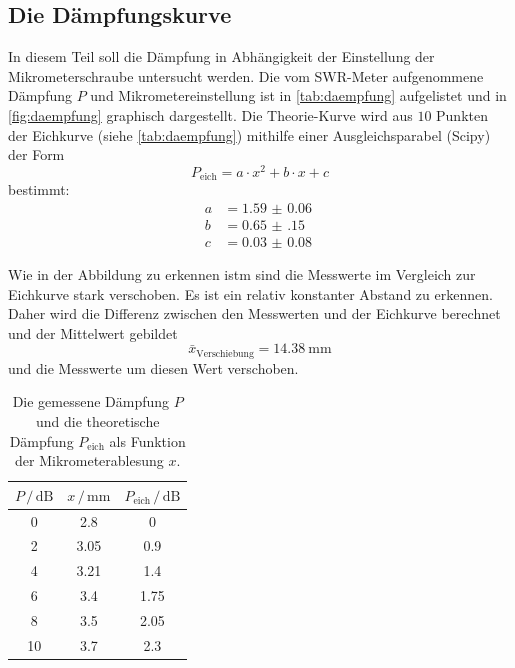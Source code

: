 \subsection{Die Dämpfungskurve}
In diesem Teil soll die Dämpfung in Abhängigkeit der Einstellung der Mikrometerschraube untersucht werden.
Die vom SWR-Meter aufgenommene Dämpfung $P$ und Mikrometereinstellung ist in \autoref{tab:daempfung} aufgelistet und in \autoref{fig:daempfung} graphisch dargestellt.
Die Theorie-Kurve wird aus $10$ Punkten der Eichkurve (siehe \autoref{tab:daempfung}) mithilfe einer Ausgleichsparabel (Scipy\cite{scipy}) der Form
\begin{equation*}
    P_\text{eich} = a \cdot x^2 + b \cdot x + c 
\end{equation*}
bestimmt:
\begin{align*}
    a &= \SI{1.59(6)}{} \\
    b &= \SI{0.65(15)}{} \\
    c &= \SI{0.03(8)}{}
\end{align*}

Wie in der Abbildung zu erkennen istm sind die Messwerte im Vergleich zur Eichkurve stark verschoben.
Es ist ein relativ konstanter Abstand zu erkennen.
Daher wird die Differenz zwischen den Messwerten und der Eichkurve berechnet und der Mittelwert gebildet
\begin{equation}
    \bar{x}_\text{Verschiebung} = \SI{14.38}{\milli\metre}
\end{equation}
und die Messwerte um diesen Wert verschoben.
\begin{table}
    \centering
    \caption{Die gemessene Dämpfung $P$ und die theoretische Dämpfung $P_\text{eich}$ als Funktion der Mikrometerablesung $x$.}
    \label{tab:daempfung}
    \begin{tabular}{S[table-format=1] S[table-format=1.2] S[table-format=1.2]}
        \toprule
        $P \,/\, \si{\dB}$ & $x \,/\, \si{\milli\metre}$ & $P_\text{eich} \,/\, \si{\dB}$\\
         & 2.8 & 0 \\
        2 & 3.05 & 0.9 \\
        4 & 3.21 & 1.4 \\
        6 & 3.4 & 1.75 \\
        8 & 3.5 & 2.05 \\
        10 & 3.7 & 2.3 \\
        \bottomrule
    \end{tabular}
\end{table}

